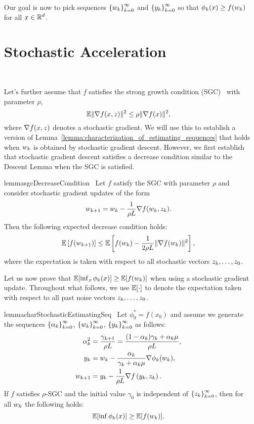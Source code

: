 Our goal is now to pick sequences \( \left\{w_k\right\}_{k=0}^\infty \) and \( \left\{y_k\right\}_{k=0}^\infty \) so that \( \phi_k(x) \geq f(w_k) \) for all \( x \in \mathbb{R}^d \).

\section{Stochastic Acceleration}~\label{sec:stochastic-acceleration}

Let's further assume that \( f \) satisfies the strong growth condition (SGC)~\citep{solodov1998incremental, tseng1998incremental, schmidt2013fast, vaswani2019fast} with parameter \( \rho \),
\[ \mathbb{E} \|\nabla f(x, z)\|^2 \leq \rho \|\nabla f(x)\|^2, \]
where \( \nabla f(x,z) \) denotes a stochastic gradient.
We will use this to establish a version of Lemma~\ref{lemma:characterization_of_estimating_sequences} that holds when \( w_k \) is obtained by stochastic gradient descent.
However, we first establish that stochastic gradient descent satisfies a decrease condition similar to the Descent Lemma when the SGC is satisfied.\\

\begin{restatable}{lemma}{sgcDecreaseCondition}~\label{lemma:SGC-decrease-condition}
    Let \( f \) satisfy the SGC with parameter \( \rho \) and consider stochastic gradient updates of the form
    \[ w_{k+1} = w_k - \frac{1}{\rho L} \nabla f(w_k, z_k). \]
    Then the following expected decrease condition holds:
    \[ \mathbb{E} \left[f(w_{k+1})\right] \leq \mathbb{E} \left[f(w_k) - \frac{1}{2 \rho L}\|\nabla f(w_k)\|^2\right],  \]
    where the expectation is taken with respect to all stochastic vectors \( z_k, \ldots, z_0 \).
\end{restatable}


Let us now prove that \( \mathbb{E}[\inf_x \phi_k(x)] \geq \mathbb{E}[f(w_k)] \) when using a stochastic gradient update.
Throughout what follows, we use \( \mathbb{E}[\cdot] \) to denote the expectation taken with respect to all past noise vectors \( z_k, \dots, z_0 \).\\

\begin{restatable}{lemma}{charStochasticEstimatingSeq}~\label{lemma:characterization_of_stochastic_estimating_sequences}
    Let \( \phi^*_0 = f(x_0) \) and assume we generate the sequences \( \left\{\alpha_k\right\}_{k=0}^\infty \), \( \left\{w_k\right\}_{k=0}^\infty \), \( \left\{y_k\right\}_{k=0}^\infty \) as follows:
    \begin{align*}
        \alpha^2_k &= \frac{\gamma_{k+1}}{\rho L } = \frac{(1-\alpha_k)\gamma_k + \alpha_k \mu}{\rho L}, \\
        y_k &= w_k - \frac{\alpha_k}{\gamma_k + \alpha_k \mu} \nabla \phi_k(w_k),\\
        w_{k+1} &= y_k - \frac{1}{\rho L} \nabla f\left(y_k, z_k\right).
    \end{align*}
    If \( f \) satisfies \( \rho \)-SGC and the initial value \( \gamma_0 \) is independent of \( \left\{z_k\right\}_{k=0}^\infty \), then for all \( w_k \) the following holds:
    \[ \mathbb{E} [\inf \phi_k(x)] \geq \mathbb{E} [f(w_k)]. \]
\end{restatable}


